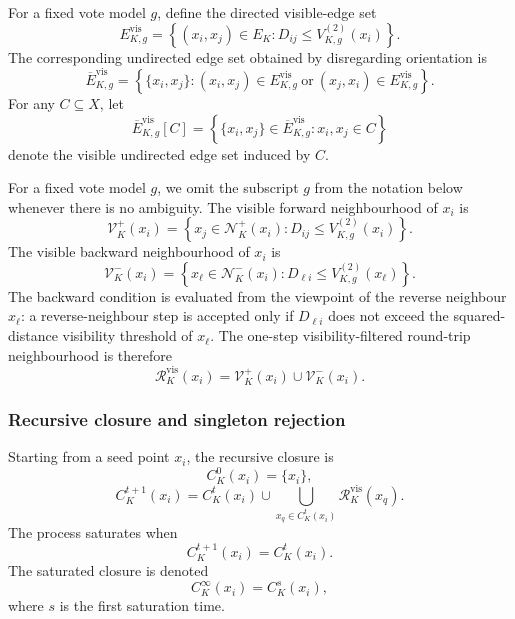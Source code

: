 \documentclass[pdflatex,sn-basic,Numbered]{sn-jnl}
\newcommand{\calN}{\mathcal{N}}
\newcommand{\calR}{\mathcal{R}}
\newcommand{\calV}{\mathcal{V}}
\begin{document}
For a fixed vote model $g$, define the directed visible-edge set
\begin{equation}
E^{\mathrm{vis}}_{K,g}
=
\left\{(x_i,x_j)\in E_K:
D_{ij}\leq V_{K,g}^{(2)}(x_i)
\right\}.
\label{eq:visible_edge_set}
\end{equation}
The corresponding undirected edge set obtained by disregarding orientation is
\begin{equation}
\overline E^{\mathrm{vis}}_{K,g}
=
\left\{
\{x_i,x_j\}:
(x_i,x_j)\in E^{\mathrm{vis}}_{K,g}
\ \text{or}\
(x_j,x_i)\in E^{\mathrm{vis}}_{K,g}
\right\}.
\label{eq:symmetrised_visible_edge_set}
\end{equation}
For any $C\subseteq X$, let
\begin{equation}
\overline E^{\mathrm{vis}}_{K,g}[C]
=
\left\{
\{x_i,x_j\}\in\overline E^{\mathrm{vis}}_{K,g}:
x_i,x_j\in C
\right\}
\label{eq:induced_visible_edge_set}
\end{equation}
denote the visible undirected edge set induced by $C$.

For a fixed vote model $g$, we omit the subscript $g$ from the notation
below whenever there is no ambiguity. The visible forward neighbourhood of $x_i$ is
\begin{equation}
\calV_K^+(x_i)=
\left\{
x_j\in\calN_K^+(x_i):
D_{ij}\leq V_{K,g}^{(2)}(x_i)
\right\}.
\label{eq:visible_forward}
\end{equation}
The visible backward neighbourhood of $x_i$ is
\begin{equation}
\calV_K^-(x_i)=
\left\{
x_\ell\in\calN_K^-(x_i):
D_{\ell i}\leq V_{K,g}^{(2)}(x_\ell)
\right\}.
\label{eq:visible_backward}
\end{equation}
The backward condition is evaluated from the viewpoint of the reverse
neighbour $x_\ell$: a reverse-neighbour step is accepted only if
$D_{\ell i}$ does not exceed the squared-distance visibility threshold of
$x_\ell$. The one-step visibility-filtered round-trip neighbourhood is
therefore
\begin{equation}
\calR_K^{\mathrm{vis}}(x_i)
=
\calV_K^+(x_i)\cup\calV_K^-(x_i).
\label{eq:visible_roundtrip}
\end{equation}


\subsubsection{Recursive closure and singleton rejection}

Starting from a seed point $x_i$, the recursive closure is
\begin{equation}
C_K^0(x_i)=\{x_i\},
\end{equation}
\begin{equation}
C_K^{t+1}(x_i)
=
C_K^t(x_i)\cup
\bigcup_{x_q\in C_K^t(x_i)}
\calR_K^{\mathrm{vis}}(x_q).
\label{eq:visibility_closure}
\end{equation}
The process saturates when
\begin{equation}
C_K^{t+1}(x_i)=C_K^t(x_i).
\end{equation}
The saturated closure is denoted
\begin{equation}
C_K^\infty(x_i)=C_K^s(x_i),
\end{equation}
where $s$ is the first saturation time.
\end{document}
